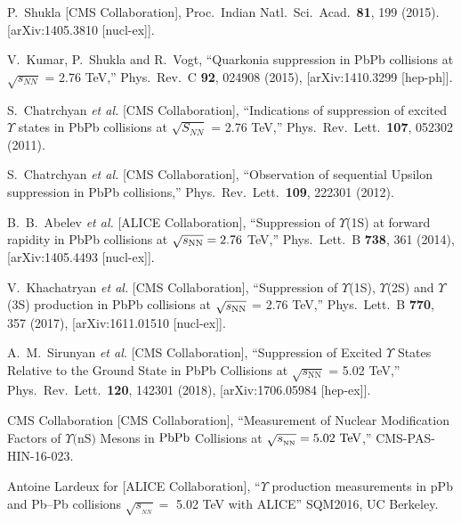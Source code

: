 \documentclass[12pt,a4paper,final]{iopart} %
\newcommand{\sNN}{\sqrt{s_{_{NN}}}}
\begin{document}
\begin{thebibliography}{100}
  
  P.~Shukla [CMS Collaboration],
  Proc.\ Indian Natl.\ Sci.\ Acad.\  {\bf 81}, 199 (2015).
  [arXiv:1405.3810 [nucl-ex]].


  V.~Kumar, P.~Shukla and R.~Vogt,
  ``Quarkonia suppression in PbPb collisions at $\sqrt{s_{NN}}$ = 2.76 TeV,''
  Phys.\ Rev.\ C {\bf 92}, 024908 (2015),
  [arXiv:1410.3299 [hep-ph]].



  S.~Chatrchyan {\it et al.}  [CMS Collaboration],
  ``Indications of suppression of excited $\Upsilon$ states in PbPb collisions at $\sqrt{S_{NN}}$ = 2.76 TeV,''
 Phys.\ Rev.\ Lett.\  {\bf 107}, 052302 (2011).

  S.~Chatrchyan {\it et al.}  [CMS Collaboration],
  ``Observation of sequential Upsilon suppression in PbPb collisions,''
  Phys.\ Rev.\ Lett.\  {\bf 109}, 222301 (2012).

  B.~B.~Abelev {\it et al.} [ALICE Collaboration],
  ``Suppression of $\Upsilon$(1S) at forward rapidity in PbPb collisions at $\sqrt{s_{\rm NN}} = 2.76$ TeV,''
  Phys.\ Lett.\ B {\bf 738}, 361 (2014), [arXiv:1405.4493 [nucl-ex]].
  
  
  V.~Khachatryan {\it et al.} [CMS Collaboration],
  ``Suppression of $\Upsilon$(1S), $\Upsilon$(2S) and $\Upsilon$(3S) production in PbPb collisions at $\sqrt{s_{\rm NN}}$ = 2.76 TeV,''
  Phys.\ Lett.\ B {\bf 770}, 357 (2017), [arXiv:1611.01510 [nucl-ex]].


  A.~M.~Sirunyan {\it et al.} [CMS Collaboration],
  ``Suppression of Excited $\Upsilon$ States Relative to the Ground State in PbPb Collisions at $\sqrt{s_\mathrm{NN}}$ = 5.02 TeV,''
  Phys.\ Rev.\ Lett.\  {\bf 120}, 142301 (2018), [arXiv:1706.05984 [hep-ex]].
  


  CMS Collaboration [CMS Collaboration],
  ``Measurement of Nuclear Modification Factors of $\Upsilon\textrm{(nS)}$ Mesons in ${\rm PbPb}$ Collisions 
  at $\sqrt{s_{_{{\rm NN}}}} = 5.02~\mathrm{TeV}$,''  CMS-PAS-HIN-16-023.


  Antoine Lardeux for [ALICE Collaboration],
   ``$\Upsilon$ production measurements in pPb and Pb–Pb collisions $\sNN =$ 5.02 TeV with ALICE'' SQM2016, UC Berkeley.
 

\end{thebibliography}
\end{document}
